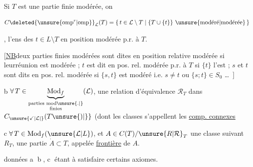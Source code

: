 
Si $T$ est une partie finie
modérée\unsure{,|;}, on  

\[
 C\deleted{\unsure{\mathrm{omp}^{r}|\mathrm{omp}}}_{\mathcal L}(T)=
 \{\,t\in\mathcal L\setminus T\mid \{T\cup\{t\}\}\ \text{\unsure{modéré|modérée}}\,\}
\]


, l'ens des $t\in L\setminus T$ en
position modérée p.r. à $T$.

[\uline{NB}\quad deux parties finies modérées
sont dites en position relative
modérée si leur\unsure{-| }réunion est
modérée ; $t$ est dit en pos. rel.
modérée p.r. à $T$ si $\{t\}$ l'est ;
$s$ et $t$ sont dits en pos. rel. modérée
si $\{s,t\}$ est modéré i.e. \unsure{,}
$s\ne t$ ou $\{s;t\}\in S_0$ \ldots\ ]


\textcircled{\scriptsize b}\quad $\forall\,T\in\underbrace{\mathrm{Mod}_{f}}_{\substack{\text{parties mod\unsure{.|}}\\\text{finies}}}(\mathcal L)$, une relation
d'équivalence $\mathcal R_T$ dans $C_{\unsure{\checkmark|\mathcal L|}}(T\unsure{)|\}}$ (dont
les classes s'appellent les \uline{comp. connexes} 


\textcircled{\scriptsize c}\quad $\forall\,T\in\mathrm{Mod}_{f}(\unsure{\mathcal L|L})$, et $A\in C(T)/\unsure{R|\mathcal R}_T$
une classe suivant $R_T$, une partie
 $\dot A\subset T$, appelée \uline{frontière} de $A$.

 données \textcircled{\scriptsize a} \textcircled{\scriptsize b}, \textcircled{\scriptsize c} étant 
à satisfaire certains axiomes.

